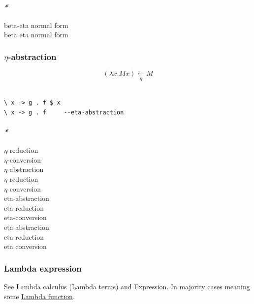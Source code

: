 \documentclass[11pt]{article}
\begin{document}
\paragraph{\emph{*}}
\label{sec:orgc2e53c7}

\label{org2ee2de8}beta-eta normal form\\
\label{orgbdc72fe}beta eta normal form\\

\subsubsection{\label{orgda12a49}\(\eta\)-abstraction}
\label{sec:org989900c}
$$ (\lambda x.Mx) \xleftarrow[\eta]{} M $$\\

\begin{verbatim}
\ x -> g . f $ x
\ x -> g . f     --eta-abstraction
\end{verbatim}

\paragraph{\emph{*}}
\label{sec:org60077c3}

\label{org2045a97}\(\eta\)-reduction\\
\label{orgd463001}\(\eta\)-conversion\\
\label{org2c0fc53}\(\eta\) abstraction\\
\label{org5e4074e}\(\eta\) reduction\\
\label{org411cf65}\(\eta\) conversion\\
\label{org015242f}eta-abstraction\\
\label{org7d02839}eta-reduction\\
\label{org4d2870a}eta-conversion\\
\label{org4a3ea91}eta abstraction\\
\label{orgd1f2c58}eta reduction\\
\label{org8c3d7b1}eta conversion\\

\subsubsection{\label{orgc15dc18}Lambda expression}
\label{sec:org0ceacb6}
See \hyperref[org617da6f]{Lambda calculus} (\hyperref[orgccc21f9]{Lambda terms}) and \hyperref[org667db83]{Expression}. In majority cases meaning some \hyperref[org496f5c2]{Lambda function}.\\
\end{document}

